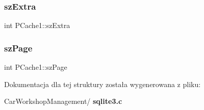 \mbox{\label{struct_p_cache1_a1e96e6671732e0af641732991b681ede}} 
\subsubsection{szExtra}
{\footnotesize\ttfamily int P\+Cache1\+::sz\+Extra}

\mbox{\label{struct_p_cache1_a1425039a858b7518c097d8ae92597de0}} 
\subsubsection{szPage}
{\footnotesize\ttfamily int P\+Cache1\+::sz\+Page}



Dokumentacja dla tej struktury została wygenerowana z pliku\+:\begin{DoxyCompactItemize}
\item 
Car\+Workshop\+Management/\textbf{ sqlite3.\+c}\end{DoxyCompactItemize}
